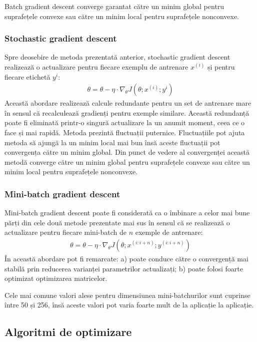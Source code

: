 Batch gradient descent converge garantat către un minim global pentru suprafețele convexe sau către un minim local pentru suprafețele nonconvexe.

\subsubsection{Stochastic gradient descent}
Spre deosebire de metoda prezentată anterior, stochastic gradient descent realizează o actualizare pentru fiecare exemplu de antrenare $x^{(i)}$ și pentru fiecare etichetă $y^{i}$:
\begin{align}
	\theta = \theta - \eta \cdot \nabla_{\theta}J(\theta;x^{(i)};y^{i})
\end{align}
Această abordare realizează calcule redundante pentru un set de antrenare mare în sensul că recalculează gradienți pentru exemple similare. Această redundanță poate fi eliminată printr-o singură actualizare la un anumit moment, ceea ce o face și mai rapidă. Metoda prezintă fluctuații puternice. Fluctuațiile pot ajuta metoda să ajungă la un minim local mai bun însă aceste fluctuații pot convergența către un minim global. Din punct de vedere al convergenței această metodă converge către un minim global pentru suprafețele convexe sau către un minim local pentru suprafețele nonconvexe.

\subsubsection{Mini-batch gradient descent}
Mini-batch gradient descent poate fi considerată ca o îmbinare a celor mai bune părți din cele două metode prezentate mai sus în sensul că se realizează o actualizare pentru fiecare mini-batch de $n$ exemple de antrenare:
\begin{align}
	\theta = \theta - \eta \cdot \nabla_{\theta}J(\theta;x^{(i:i+n)};y^{(i:i+n)})
\end{align} 
În această abordare pot fi remarcate: a) poate conduce către o convergență mai stabilă prin reducerea varianței parametrilor actualizați; b) poate folosi foarte optimizat optimizarea matricelor.

Cele mai comune valori alese pentru dimensiunea mini-batchurilor sunt cuprinse între 50 și 256, însă aceste valori pot varia foarte mult de la aplicație la aplicație.

\subsection{Algoritmi de optimizare}
